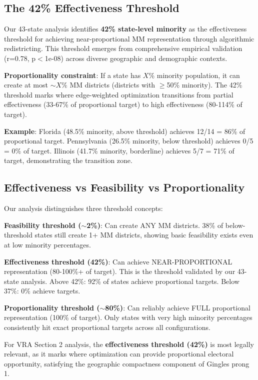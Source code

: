 \subsection{The 42\% Effectiveness Threshold}

Our 43-state analysis identifies \textbf{42\% state-level minority} as the effectiveness threshold for achieving near-proportional MM representation through algorithmic redistricting. This threshold emerges from comprehensive empirical validation (r=0.78, p$<$1e-08) across diverse geographic and demographic contexts.

\textbf{Proportionality constraint}: If a state has $X$\% minority population, it can create at most $\sim X$\% MM districts (districts with $\geq$50\% minority). The 42\% threshold marks where edge-weighted optimization transitions from partial effectiveness (33-67\% of proportional target) to high effectiveness (80-114\% of target).

\textbf{Example}: Florida (48.5\% minority, above threshold) achieves 12/14 = 86\% of proportional target. Pennsylvania (26.5\% minority, below threshold) achieves 0/5 = 0\% of target. Illinois (41.7\% minority, borderline) achieves 5/7 = 71\% of target, demonstrating the transition zone.

\subsection{Effectiveness vs Feasibility vs Proportionality}

Our analysis distinguishes three threshold concepts:

\textbf{Feasibility threshold ($\sim$2\%)}: Can create ANY MM districts. 38\% of below-threshold states still create 1+ MM districts, showing basic feasibility exists even at low minority percentages.

\textbf{Effectiveness threshold (42\%)}: Can achieve NEAR-PROPORTIONAL representation (80-100\%+ of target). This is the threshold validated by our 43-state analysis. Above 42\%: 92\% of states achieve proportional targets. Below 37\%: 0\% achieve targets.

\textbf{Proportionality threshold ($\sim$80\%)}: Can reliably achieve FULL proportional representation (100\% of target). Only states with very high minority percentages consistently hit exact proportional targets across all configurations.

For VRA Section 2 analysis, the \textbf{effectiveness threshold (42\%)} is most legally relevant, as it marks where optimization can provide proportional electoral opportunity, satisfying the geographic compactness component of Gingles prong 1.

